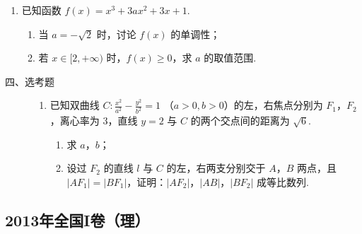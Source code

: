 \begin{description}
\begin{enumerate}[leftmargin=5pt]
        \item 已知函数 \( f(x) = x^3 + 3ax^2 + 3x + 1 \).

\begin{enumerate}
\item 当 \(a = -\sqrt{2}\) 时，讨论 \(f(x)\) 的单调性；
\item 若 \(x \in [2, +\infty)\) 时，\(f(x) \geqslant 0\)，求 \(a\) 的取值范围.
\end{enumerate}

    \end{enumerate}

\end{description}

\begin{description}

    \item[四、选考题]

    \begin{enumerate}[leftmargin=5pt]

      \addtocounter{enumi}{+21}

        \item 已知双曲线 \(C: \frac{x^2}{a^2} - \frac{y^2}{b^2} = 1 \) （\(a > 0, b > 0\)）的左，右焦点分别为 \(F_1\)，\(F_2\)，离心率为 3，直线 \(y = 2\) 与 \(C\) 的两个交点间的距离为 \(\sqrt{6}\).

\begin{enumerate}
\item 求 \(a\)，\(b\)；
\item 设过 \(F_{2}\) 的直线 \(l\) 与 \(C\) 的左，右两支分别交于 \(A\)，\(B\) 两点，且 \(|AF_{1}| = |BF_{1}|\)，证明：\(|AF_{2}|\)，\(|AB|\)，\(|BF_{2}|\) 成等比数列.
\end{enumerate}

    \end{enumerate}

\end{description}


\subsection{2013年全国I卷（理）}\label{gk:2013年全国I卷（理）}

